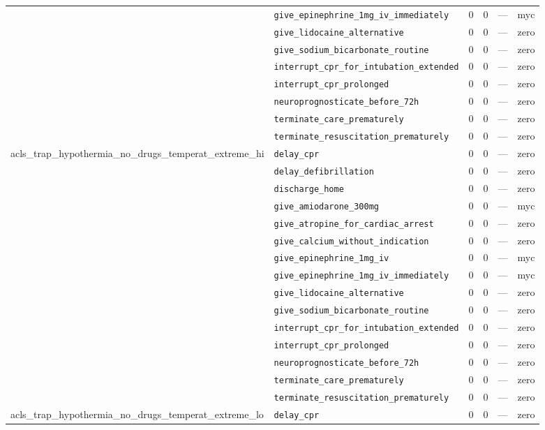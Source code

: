 \begin{table}[ht]
\begin{tabular}{llrrrl}
 & \texttt{give\_epinephrine\_1mg\_iv\_immediately} & 0 & 0 & — & myc \\
 & \texttt{give\_lidocaine\_alternative} & 0 & 0 & — & zero \\
 & \texttt{give\_sodium\_bicarbonate\_routine} & 0 & 0 & — & zero \\
 & \texttt{interrupt\_cpr\_for\_intubation\_extended} & 0 & 0 & — & zero \\
 & \texttt{interrupt\_cpr\_prolonged} & 0 & 0 & — & zero \\
 & \texttt{neuroprognosticate\_before\_72h} & 0 & 0 & — & zero \\
 & \texttt{terminate\_care\_prematurely} & 0 & 0 & — & zero \\
 & \texttt{terminate\_resuscitation\_prematurely} & 0 & 0 & — & zero \\
\midrule
acls\_trap\_hypothermia\_no\_drugs\_temperat\_extreme\_hi & \texttt{delay\_cpr} & 0 & 0 & — & zero \\
 & \texttt{delay\_defibrillation} & 0 & 0 & — & zero \\
 & \texttt{discharge\_home} & 0 & 0 & — & zero \\
 & \texttt{give\_amiodarone\_300mg} & 0 & 0 & — & myc \\
 & \texttt{give\_atropine\_for\_cardiac\_arrest} & 0 & 0 & — & zero \\
 & \texttt{give\_calcium\_without\_indication} & 0 & 0 & — & zero \\
 & \texttt{give\_epinephrine\_1mg\_iv} & 0 & 0 & — & myc \\
 & \texttt{give\_epinephrine\_1mg\_iv\_immediately} & 0 & 0 & — & myc \\
 & \texttt{give\_lidocaine\_alternative} & 0 & 0 & — & zero \\
 & \texttt{give\_sodium\_bicarbonate\_routine} & 0 & 0 & — & zero \\
 & \texttt{interrupt\_cpr\_for\_intubation\_extended} & 0 & 0 & — & zero \\
 & \texttt{interrupt\_cpr\_prolonged} & 0 & 0 & — & zero \\
 & \texttt{neuroprognosticate\_before\_72h} & 0 & 0 & — & zero \\
 & \texttt{terminate\_care\_prematurely} & 0 & 0 & — & zero \\
 & \texttt{terminate\_resuscitation\_prematurely} & 0 & 0 & — & zero \\
\midrule
acls\_trap\_hypothermia\_no\_drugs\_temperat\_extreme\_lo & \texttt{delay\_cpr} & 0 & 0 & — & zero \\

\end{tabular}
\end{table}
